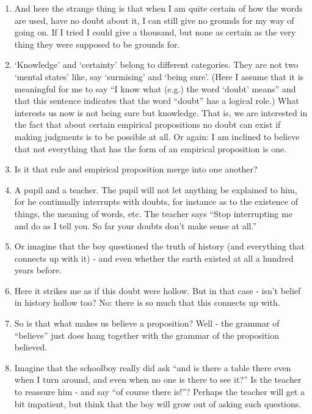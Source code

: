 \documentclass{book}
\begin{document}
\begin{enumerate}
\item
And here the strange thing is that when I am quite certain of how the words are
used, have no doubt about it, I can still give no grounds for my way of going
on. If I tried I could give a thousand, but none as certain as the very thing
they were supposed to be grounds for.

\item
`Knowledge' and `certainty' belong to different categories. They are not two
`mental states' like, say `surmising' and `being sure'. (Here I assume that it
is meaningful for me to say ``I know what (e.g.) the word `doubt' means'' and
that this sentence indicates that the word ``doubt'' has a logical role.) What
interests us now is not being sure but knowledge. That is, we are interested in
the fact that about certain empirical propositions no doubt can exist if making
judgments is to be possible at all. Or again: I am inclined to believe that not
everything that has the form of an empirical proposition is one.

\item
Is it that rule and empirical proposition merge into one another?

\item
A pupil and a teacher. The pupil will not let anything be explained to him, for
he continually interrupts with doubts, for instance as to the existence of
things, the meaning of words, etc. The teacher says ``Stop interrupting me and
do as I tell you. So far your doubts don't make sense at all.''

\item
Or imagine that the boy questioned the truth of history (and everything that
connects up with it) - and even whether the earth existed at all a hundred
years before.

\item
Here it strikes me as if this doubt were hollow. But in that case - isn't
belief in history hollow too? No: there is so much that this connects up with.

\item
So is that what makes us believe a proposition? Well - the grammar of
``believe'' just does hang together with the grammar of the proposition
believed.

\item
Imagine that the schoolboy really did ask ``and is there a table there even
when I turn around, and even when no one is there to see it?'' Is the teacher
to reassure him - and say ``of course there is!''?  Perhaps the teacher will
get a bit impatient, but think that the boy will grow out of asking such
questions.


\end{enumerate}
\end{document}
